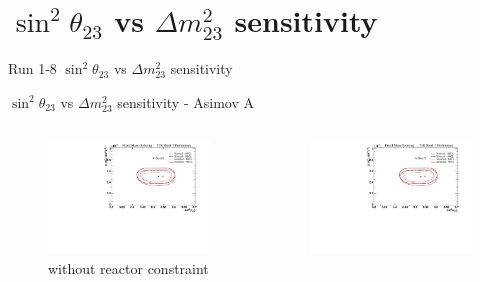 \documentclass{beamer}
\newcommand{\sinsqthetatwothree}{$\sin^2\theta_{23}$\xspace}
\newcommand{\dmsqtwothree}{$\Delta m^2_{23}$\xspace}
\begin{document}
\section{\sinsqthetatwothree vs \dmsqtwothree sensitivity}
\begin{frame}
	\centering
	\Large Run 1-8 \sinsqthetatwothree vs \dmsqtwothree sensitivity\\
\end{frame}

\begin{frame}{\sinsqthetatwothree vs \dmsqtwothree sensitivity - Asimov A}
	\centering
	\begin{columns}
		\begin{column}{0.5\paperwidth}
			\begin{figure}
				\includegraphics[trim={0cm 0cm 0cm 0cm}, clip, scale=0.33] {images/sensitivity/th23_dmsq23_global_t2k}
				\caption*{without reactor constraint}
			\end{figure}
		\end{column}
		\begin{column}{0.5\paperwidth}
			\begin{figure}
				\includegraphics[trim={0cm 0cm 0cm 0cm}, clip, scale=0.33] {images/sensitivity/th23_dmsq23_global_t2k}

\end{figure}
\end{column}
\end{columns}
\end{frame}
\end{document}
